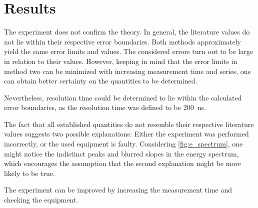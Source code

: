 \chapter{Results}
The experiment does not confirm the theory.
In general, the literature values do not lie within their respective error boundaries.
Both methods approximately yield the same error limits and values.
The considered errors turn out to be large in relation to their values.
However, keeping in mind that the error limits in method two can be minimized with increasing measurement time and series, one can obtain better certainty on the quantities to be determined.

Nevertheless, resolution time could be determined to lie within the calculated error boundaries, as the resolution time was defined to be \SI{200}{\ns}.

The fact that all established quantities do not resemble their respective literature values suggests two possible explanations:
Either the experiment was performed incorrectly, or the used equipment is faulty.
Considering \autoref{fig:e_spectrum}, one might notice the indistinct peaks and blurred slopes in the energy spectrum, which encourages the assumption that the second explanation might be more likely to be true.

The experiment can be improved by increasing the measurement time and checking the equipment.
